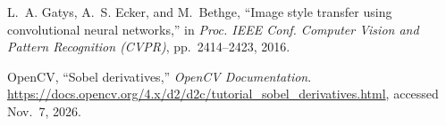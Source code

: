 L.~A. Gatys, A.~S. Ecker, and M.~Bethge,
``Image style transfer using convolutional neural networks,''
in \textit{Proc. IEEE Conf. Computer Vision and Pattern Recognition (CVPR)},
pp.~2414--2423, 2016.

OpenCV, ``Sobel derivatives,'' \textit{OpenCV Documentation}.
\url{https://docs.opencv.org/4.x/d2/d2c/tutorial_sobel_derivatives.html},
accessed Nov.~7, 2026.
